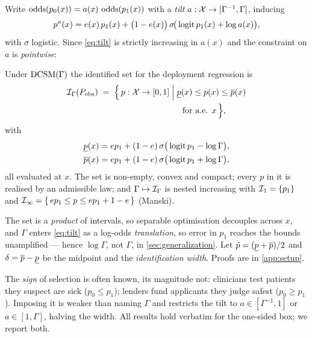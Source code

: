 Write $\operatorname{odds}(p_0(x)) = a(x)\,\operatorname{odds}(p_1(x))$ with a \emph{tilt}
$a:\mathcal{X}\to[\Gamma^{-1},\Gamma]$, inducing
\begin{equation}
  p^{a}(x)
  = e(x)\,p_1(x)+\big(1-e(x)\big)\,\sigma\!\big(\operatorname{logit} p_1(x) + \log a(x)\big),
\label{eq:tilt}
\end{equation}
with $\sigma$ logistic. Since \eqref{eq:tilt} is strictly increasing in
$a(x)$ and the constraint on $a$ is \emph{pointwise}:

\begin{lemma}
\label{lem:box}
Under $\textup{DCSM}(\Gamma)$ the identified set for the deployment regression is
\[
\begin{aligned}
  \mathcal{I}_\Gamma(P_{\mathrm{obs}})
  \;=\;
  \Big\{\, p:\mathcal{X}\to[0,1] \;\Big|\;& \underline{p}(x) \le p(x) \le \overline{p}(x)\\
  &\ \text{ for a.e. } x \,\Big\},
\end{aligned}
\]
with
\[
\begin{aligned}
  \underline{p}(x) &= e p_1 + (1-e)\,\sigma\big(\operatorname{logit} p_1 - \log\Gamma\big),\\
  \overline{p}(x) &= e p_1 + (1-e)\,\sigma\big(\operatorname{logit} p_1 + \log\Gamma\big),
\end{aligned}
\]
all evaluated at $x$. The set is non-empty, convex and compact; every $p$ in it
is realised by an admissible law; and $\Gamma\mapsto\mathcal{I}_\Gamma$ is nested
increasing with $\mathcal{I}_1 = \{p_1\}$ and
$\mathcal{I}_\infty = \{\,e p_1 \le p \le e p_1 + 1 - e\,\}$ (Manski).
\end{lemma}

The set is a \emph{product} of intervals, so separable optimisation decouples
across $x$, and $\Gamma$ enters \eqref{eq:tilt} as a log-odds
\emph{translation}, so error in $p_1$ reaches the bounds unamplified --- hence
$\log\Gamma$, not $\Gamma$, in \cref{sec:generalization}. Let
$\tilde p=(\underline{p}+\overline{p})/2$ and $\delta=\overline{p}-\underline{p}$ be the midpoint and the
\emph{identification width}. Proofs are in \cref{app:setup}.

\begin{remark}
\label{rem:directional}
The \emph{sign} of selection is often known, its magnitude not:
clinicians test patients they suspect are sick ($p_0 \le p_1$); lenders fund
applicants they judge safest ($p_0 \ge p_1$). Imposing it is weaker than
naming $\Gamma$ and restricts the tilt to $a\in[\Gamma^{-1},1]$ or
$a\in[1,\Gamma]$, halving the width. All results hold verbatim for the
one-sided box; we report both.
\end{remark}
